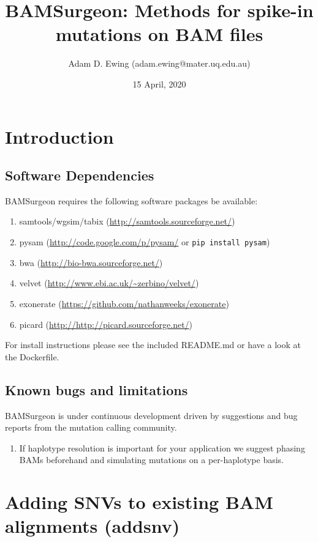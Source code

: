 \documentclass[letterpaper,11pt]{article}
\title{BAMSurgeon: Methods for spike-in mutations on BAM files}
\author{Adam D. Ewing (adam.ewing@mater.uq.edu.au)}
\begin{document}
 \date{15 April, 2020}
 \maketitle

\section{Introduction}
\subsection{Software Dependencies}
BAMSurgeon requires the following software packages be available:

\begin{enumerate}
  \item samtools/wgsim/tabix (\url{http://samtools.sourceforge.net/})
  \item pysam (\url{http://code.google.com/p/pysam/} or \texttt{pip install pysam})
  \item bwa (\url{http://bio-bwa.sourceforge.net/})
  \item velvet (\url{http://www.ebi.ac.uk/~zerbino/velvet/})
  \item exonerate (\url{https://github.com/nathanweeks/exonerate})
  \item picard (\url{http://http://picard.sourceforge.net/})
\end{enumerate}

For install instructions please see the included README.md or have a look at the Dockerfile.


\subsection{Known bugs and limitations}
BAMSurgeon is under continuous development driven by suggestions and bug reports from the mutation calling community.

\begin{enumerate}
\item If haplotype resolution is important for your application we suggest phasing BAMs beforehand and simulating mutations on a per-haplotype basis.
\end{enumerate}



\section{Adding SNVs to existing BAM alignments (addsnv)}
\end{document}
